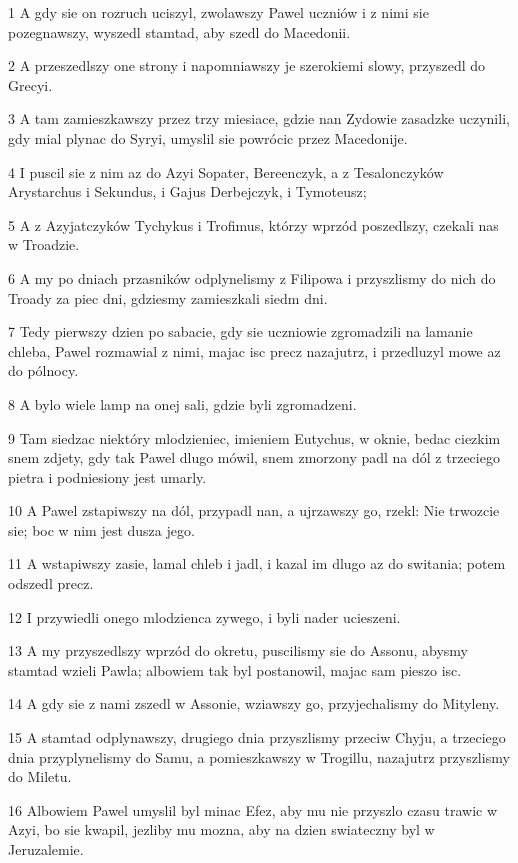 \par 1 A gdy sie on rozruch uciszyl, zwolawszy Pawel uczniów i z nimi sie pozegnawszy, wyszedl stamtad, aby szedl do Macedonii.
\par 2 A przeszedlszy one strony i napomniawszy je szerokiemi slowy, przyszedl do Grecyi.
\par 3 A tam zamieszkawszy przez trzy miesiace, gdzie nan Zydowie zasadzke uczynili, gdy mial plynac do Syryi, umyslil sie powrócic przez Macedonije.
\par 4 I puscil sie z nim az do Azyi Sopater, Bereenczyk, a z Tesalonczyków Arystarchus i Sekundus, i Gajus Derbejczyk, i Tymoteusz;
\par 5 A z Azyjatczyków Tychykus i Trofimus, którzy wprzód poszedlszy, czekali nas w Troadzie.
\par 6 A my po dniach przasników odplynelismy z Filipowa i przyszlismy do nich do Troady za piec dni, gdziesmy zamieszkali siedm dni.
\par 7 Tedy pierwszy dzien po sabacie, gdy sie uczniowie zgromadzili na lamanie chleba, Pawel rozmawial z nimi, majac isc precz nazajutrz, i przedluzyl mowe az do pólnocy.
\par 8 A bylo wiele lamp na onej sali, gdzie byli zgromadzeni.
\par 9 Tam siedzac niektóry mlodzieniec, imieniem Eutychus, w oknie, bedac ciezkim snem zdjety, gdy tak Pawel dlugo mówil, snem zmorzony padl na dól z trzeciego pietra i podniesiony jest umarly.
\par 10 A Pawel zstapiwszy na dól, przypadl nan, a ujrzawszy go, rzekl: Nie trwozcie sie; boc w nim jest dusza jego.
\par 11 A wstapiwszy zasie, lamal chleb i jadl, i kazal im dlugo az do switania; potem odszedl precz.
\par 12 I przywiedli onego mlodzienca zywego, i byli nader ucieszeni.
\par 13 A my przyszedlszy wprzód do okretu, puscilismy sie do Assonu, abysmy stamtad wzieli Pawla; albowiem tak byl postanowil, majac sam pieszo isc.
\par 14 A gdy sie z nami zszedl w Assonie, wziawszy go, przyjechalismy do Mityleny.
\par 15 A stamtad odplynawszy, drugiego dnia przyszlismy przeciw Chyju, a trzeciego dnia przyplynelismy do Samu, a pomieszkawszy w Trogillu, nazajutrz przyszlismy do Miletu.
\par 16 Albowiem Pawel umyslil byl minac Efez, aby mu nie przyszlo czasu trawic w Azyi, bo sie kwapil, jezliby mu mozna, aby na dzien swiateczny byl w Jeruzalemie.
